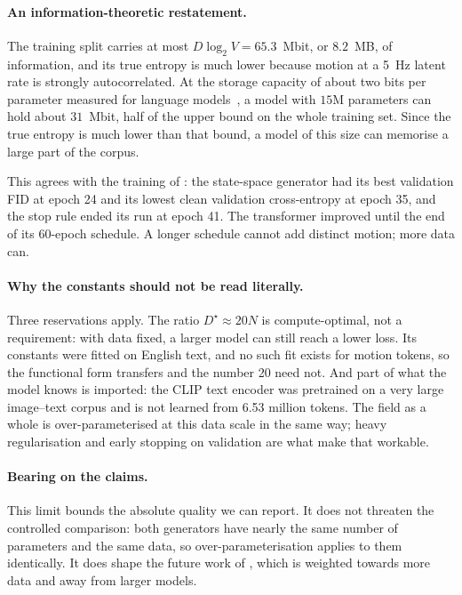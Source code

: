 \paragraph{An information-theoretic restatement.} The training split carries at most $D \log_2 V = 65.3$~Mbit, or $8.2$~MB, of information, and its true entropy is much lower because motion at a 5~Hz latent rate is strongly autocorrelated. At the storage capacity of about two bits per parameter measured for language models~\cite{allenzhu2024capacity}, a model with $15$M parameters can hold about $31$~Mbit, half of the upper bound on the whole training set. Since the true entropy is much lower than that bound, a model of this size can memorise a large part of the corpus.

This agrees with the training of : the state-space generator had its best validation FID at epoch 24 and its lowest clean validation cross-entropy at epoch 35, and the stop rule ended its run at epoch 41. The transformer improved until the end of its 60-epoch schedule. A longer schedule cannot add distinct motion; more data can.

\paragraph{Why the constants should not be read literally.} Three reservations apply. The ratio $D^\star \approx 20N$ is compute-optimal, not a requirement: with data fixed, a larger model can still reach a lower loss. Its constants were fitted on English text, and no such fit exists for motion tokens, so the functional form transfers and the number 20 need not. And part of what the model knows is imported: the CLIP text encoder was pretrained on a very large image--text corpus and is not learned from 6.53 million tokens. The field as a whole is over-parameterised at this data scale in the same way; heavy regularisation and early stopping on validation are what make that workable.

\paragraph{Bearing on the claims.} This limit bounds the absolute quality we can report. It does not threaten the controlled comparison: both generators have nearly the same number of parameters and the same data, so over-parameterisation applies to them identically. It does shape the future work of , which is weighted towards more data and away from larger models.


